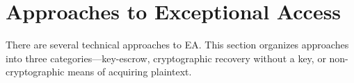 


\section{Approaches to Exceptional Access}
\label{sec-tech-approaches}





There are several technical approaches to \ac{EA}. This section organizes approaches into three
categories---\ac{key-escrow}, cryptographic recovery without a key, or non-cryptographic means of acquiring plaintext.

\newcommand{\propsstart}[0]{\begin{itemize}}
\newcommand{\prop}[2]{ %
    \item \textbf{#1} \nopagebreak

    \vspace{0.5\baselineskip} \parbox{\linewidth}{#2} \vspace{0.5\baselineskip}
}
\newcommand{\propsend}{\end{itemize}}


